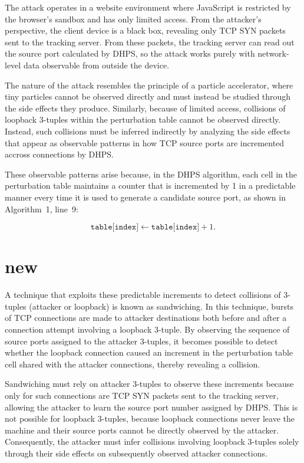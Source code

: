 \documentclass{report}
\begin{document}
The attack operates in a website environment where JavaScript is restricted by the \alert{browser’s sandbox} and has only limited access. From the attacker’s perspective, the client device is a \alert{black box}, revealing only \alert{TCP SYN packets} sent to the tracking server. From these packets, the tracking server can read out the source port calculated by DHPS, so the attack works purely with network-level data observable from outside the device.

The nature of the attack resembles the principle of a \alert{particle accelerator}, where tiny particles cannot be observed directly and must instead be studied through the side effects they produce. Similarly, because of limited access, collisions of loopback 3-tuples within the perturbation table \alert{cannot be observed directly}. Instead, such collisions must be inferred indirectly by analyzing the side effects that appear as observable patterns in how TCP source ports are incremented accross connections by DHPS.

These observable patterns arise because, in the DHPS algorithm, each cell in the perturbation table maintains a counter that is incremented by 1 in a predictable manner every time it is used to generate a candidate source port, as shown in Algorithm~1, line~9:

\[
\texttt{table[index]} \leftarrow \texttt{table[index]} + 1.
\]

\section{new}
\label{sec:new}

A technique that exploits these predictable increments to detect collisions of 3-tuples (attacker or loopback) is known as \alert{sandwiching}. In this technique, bursts of TCP connections are made to attacker destinations both before and after a connection attempt involving a loopback 3-tuple. By observing the sequence of source ports assigned to the attacker 3-tuples, it becomes possible to detect whether the loopback connection caused an increment in the perturbation table cell shared with the attacker connections, thereby revealing a collision.

Sandwiching must rely on \alert{attacker 3-tuples} to observe these increments because only for such connections are TCP SYN packets sent to the tracking server, allowing the attacker to learn the source port number assigned by DHPS. This is not possible for \alert{loopback 3-tuples}, because loopback connections never leave the machine and their source ports cannot be directly observed by the attacker. Consequently, the attacker must infer collisions involving loopback 3-tuples solely through their side effects on subsequently observed attacker connections.
\end{document}
